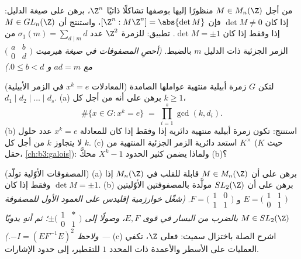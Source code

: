 \begin{exercise}[$\star\star\star$]\label{exo:b3:modules:10}
من أجل $M \in M_n(\Z)$ منظورًا إليها بوصفها تشاكلًا ذاتيًا
 $\Z^n$، برهن على صيغة الدليل: إذا كان $\det M \ne 0$ فإن
$[\Z^n : M\Z^n] = \abs{\det M}$، واستنتج أن $M \in GL_n(\Z)$ إذا وفقط إذا كان
$\det M = \pm 1$. تطبيق: للزمرة $\Z^2$ عدد $\sigma_1(m) = \sum_{d \mid m} d$ من الزمر
الجزئية ذات الدليل $m$ بالضبط. \emph{(أحصِ المصفوفات في صيغة
هيرميت $\bigl(\begin{smallmatrix}
a & b\\ 0 & d\end{smallmatrix}\bigr)$ مع $ad = m$ و $0 \leq b <
d$.)}
\end{exercise}

\begin{exercise}[$\star\star$]\label{exo:b3:modules:11}
(المعادلات $x^k = e$ في الزمر الأبيلية) لتكن $G$ زمرة أبيلية
منتهية عواملها الصامدة $d_1 \mid d_2 \mid \dots
\mid d_s$.
(a) برهن على أنه من أجل كل $k \geq 1$،
\[
\#\{x \in G : x^k = e\} \;=\; \prod_{i=1}^{s}\gcd(k, d_i) .
\]
(b) استنتج: تكون زمرة أبيلية منتهية دائرية إذا وفقط إذا كان
للمعادلة $x^k = e$ عدد حلول لا يتجاوز $k$ من أجل كل $k$.
(c) استعد دائرية الزمر الجزئية المنتهية من $K^\times$ (حيث $K$
حقل، \cref{ch:b3:galois}): ولماذا يضمن كثير الحدود $X^k - 1$ محكَّ (b)؟
\end{exercise}

\begin{exercise}[$\star\star\star$]\label{exo:b3:modules:12}
(المصفوفات الأوّلية تولّد) (a) برهن على أن $M \in M_n(\Z)$ قابلة
للقلب في $M_n(\Z)$ إذا وفقط إذا كان $\det M = \pm1$.
(b) برهن على أن $SL_2(\Z)$ مولَّدة بالمصفوفتين الأوّليتين
$E = \bigl(\begin{smallmatrix}1 & 1\\ 0 &
1\end{smallmatrix}\bigr)$ و $F = \bigl(\begin{smallmatrix}1 & 0\\ 1 &
1\end{smallmatrix}\bigr)$.
\emph{(شغّل خوارزمية إقليدس على العمود الأول للمصفوفة $M
\in SL_2(\Z)$
بالضرب من اليسار في قوى $E, F$، وصولًا إلى $\pm\bigl(\begin{smallmatrix}1 & *\\ 0 &
1\end{smallmatrix}\bigr)$؛ ثم أنهِ
يدويًا --- ولاحظ $-I = (EF^{-1}E)^2$.)}
(c) اشرح الصلة باختزال سميث: فعلى $\Z$، تكفي العمليات على الأسطر
والأعمدة ذات المحدد $1$ للتقطير، إلى حدود الإشارات.
\end{exercise}

